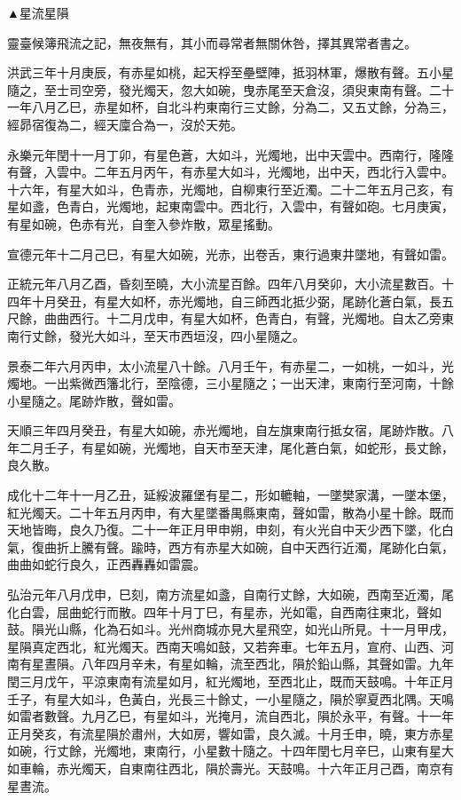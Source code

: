 \begin{pinyinscope}
▲星流星隕

靈臺候簿飛流之記，無夜無有，其小而尋常者無關休咎，擇其異常者書之。

洪武三年十月庚辰，有赤星如桃，起天桴至壘壁陣，抵羽林軍，爆散有聲。五小星隨之，至士司空旁，發光燭天，忽大如碗，曳赤尾至天倉沒，須臾東南有聲。二十一年八月乙巳，赤星如杯，自北斗杓東南行三丈餘，分為二，又五丈餘，分為三，經昴宿復為二，經天廩合為一，沒於天苑。

永樂元年閏十一月丁卯，有星色蒼，大如斗，光燭地，出中天雲中。西南行，隆隆有聲，入雲中。二年五月丙午，有赤星大如斗，光燭地，出中天，西北行入雲中。十六年，有星大如斗，色青赤，光燭地，自柳東行至近濁。二十二年五月己亥，有星如盞，色青白，光燭地，起東南雲中。西北行，入雲中，有聲如砲。七月庚寅，有星如碗，色赤有光，自奎入參炸散，眾星搖動。

宣德元年十二月己巳，有星大如碗，光赤，出卷舌，東行過東井墜地，有聲如雷。

正統元年八月乙酉，昏刻至曉，大小流星百餘。四年八月癸卯，大小流星數百。十四年十月癸丑，有星大如杯，赤光燭地，自三師西北抵少弼，尾跡化蒼白氣，長五尺餘，曲曲西行。十二月戊申，有星大如杯，色青白，有聲，光燭地。自太乙旁東南行丈餘，發光大如斗，至天市西垣沒，四小星隨之。

景泰二年六月丙申，太小流星八十餘。八月壬午，有赤星二，一如桃，一如斗，光燭地。一出紫微西籓北行，至陰德，三小星隨之；一出天津，東南行至河南，十餘小星隨之。尾跡炸散，聲如雷。

天順三年四月癸丑，有星大如碗，赤光燭地，自左旗東南行抵女宿，尾跡炸散。八年二月壬子，有星如碗，光燭地，自天市至天津，尾化蒼白氣，如蛇形，長丈餘，良久散。

成化十二年十一月乙丑，延綏波羅堡有星二，形如轆軸，一墜樊家溝，一墜本堡，紅光燭天。二十年五月丙申，有大星墜番禺縣東南，聲如雷，散為小星十餘。既而天地皆晦，良久乃復。二十一年正月甲申朔，申刻，有火光自中天少西下墜，化白氣，復曲折上騰有聲。踰時，西方有赤星大如碗，自中天西行近濁，尾跡化白氣，曲曲如蛇行良久，正西轟轟如雷震。

弘治元年八月戊申，巳刻，南方流星如盞，自南行丈餘，大如碗，西南至近濁，尾化白雲，屈曲蛇行而散。四年十月丁巳，有星赤，光如電，自西南往東北，聲如鼓。隕光山縣，化為石如斗。光州商城亦見大星飛空，如光山所見。十一月甲戌，星隕真定西北，紅光燭天。西南天鳴如鼓，又若奔車。七年五月，宣府、山西、河南有星晝隕。八年四月辛未，有星如輪，流至西北，隕於鉛山縣，其聲如雷。九年閏三月戊午，平涼東南有流星如月，紅光燭地，至西北止，既而天鼓鳴。十年正月壬子，有星大如斗，色黃白，光長三十餘丈，一小星隨之，隕於寧夏西北隅。天鳴如雷者數聲。九月乙巳，有星如斗，光掩月，流自西北，隕於永平，有聲。十一年正月癸亥，有流星隕於肅州，大如房，響如雷，良久滅。十月壬申，曉，東方赤星如碗，行丈餘，光燭地，東南行，小星數十隨之。十四年閏七月辛巳，山東有星大如車輪，赤光燭天，自東南往西北，隕於壽光。天鼓鳴。十六年正月己酉，南京有星晝流。


\end{pinyinscope}
